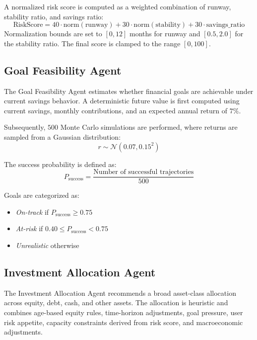 \documentclass{svproc}
\begin{document}
A normalized risk score is computed as a weighted combination of runway, stability ratio, and savings ratio:
\begin{equation}
\text{RiskScore} = 40 \cdot \text{norm}(\text{runway}) + 30 \cdot \text{norm}(\text{stability}) + 30 \cdot \text{savings\_ratio}
\end{equation}
Normalization bounds are set to $[0,12]$ months for runway and $[0.5, 2.0]$ for the stability ratio. The final score is clamped to the range $[0,100]$.

\subsection{Goal Feasibility Agent}
The Goal Feasibility Agent estimates whether financial goals are achievable under current savings behavior. A deterministic future value is first computed using current savings, monthly contributions, and an expected annual return of $7\%$.

Subsequently, $500$ Monte Carlo simulations are performed, where returns are sampled from a Gaussian distribution:
\begin{equation}
r \sim \mathcal{N}(0.07, 0.15^2)
\end{equation}

The success probability is defined as:
\begin{equation}
P_{\text{success}} = \frac{\text{Number of successful trajectories}}{500}
\end{equation}

Goals are categorized as:
\begin{itemize}
    \item \textit{On-track} if $P_{\text{success}} \geq 0.75$
    \item \textit{At-risk} if $0.40 \leq P_{\text{success}} < 0.75$
    \item \textit{Unrealistic} otherwise
\end{itemize}

\subsection{Investment Allocation Agent}
The Investment Allocation Agent recommends a broad asset-class allocation across equity, debt, cash, and other assets. The allocation is heuristic and combines age-based equity rules, time-horizon adjustments, goal pressure, user risk appetite, capacity constraints derived from risk score, and macroeconomic adjustments.
\end{document}
